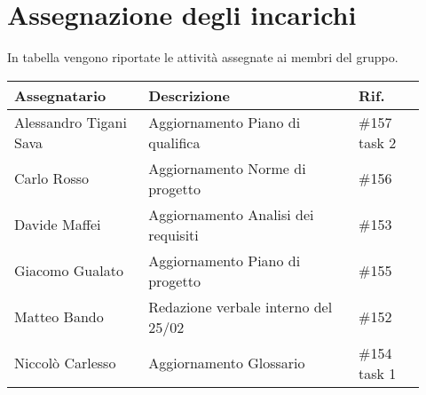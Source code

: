 \section{Assegnazione degli incarichi}
In tabella vengono riportate le attività assegnate ai membri del gruppo.
\begin{center}
	{
		\renewcommand{\arraystretch}{1.5}
		\begin{tabular}{p{0.30\linewidth}|p{0.47\linewidth}|p{0.15\linewidth}}
			\textbf{Assegnatario}	& \textbf{Descrizione}					& \textbf{Rif.} \\
			\hline
			Alessandro Tigani Sava	& Aggiornamento Piano di qualifica		& \#157 task 2 \\
			\hline
			Carlo Rosso				& Aggiornamento Norme di progetto		& \#156	\\
			\hline
			Davide Maffei			& Aggiornamento Analisi dei requisiti	& \#153	\\
			\hline
			Giacomo Gualato			& Aggiornamento Piano di progetto		& \#155	\\
			\hline
			Matteo Bando 			&  Redazione verbale interno del 25/02	& \#152	\\
			\hline
			Niccolò Carlesso		& Aggiornamento Glossario				& \#154 task 1	\\
			\hline
		\end{tabular}
	}
\end{center}

